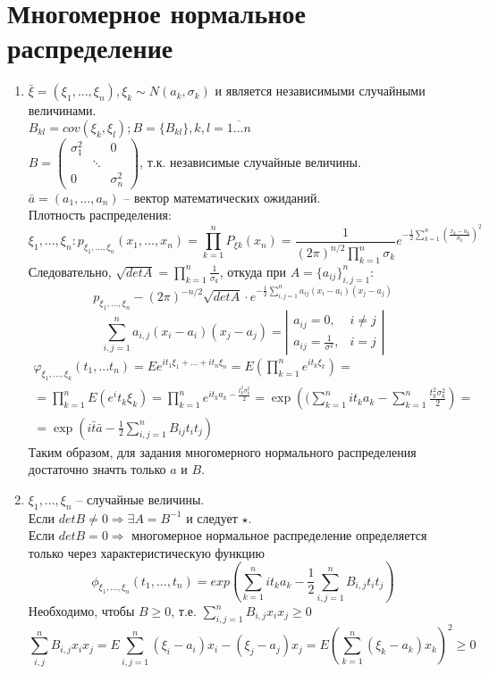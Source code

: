 \section{Многомерное нормальное распределение}
\begin{enumerate}
 \item $\bar{\xi}=(\xi_1,...,\xi_n), \xi_k \sim N(a_k, \sigma_k)$ и является независимыми случайными величинами.\\
 $B_{kl}=cov(\xi_k, \xi_l); B = \{B_{kl}\}, k,l = \overline{1...n}$\\
 $B = \begin{pmatrix}\sigma_{1}^2 &  & 0 \\ & \ddots & \\ 0 &  & \sigma_n^2\end{pmatrix}$, т.к. независимые случайные величины.\\
$\bar{a}=(a_1,...,a_n)$ -- вектор математических ожиданий.\\
Плотность распределения:
$$\xi_1, ..., \xi_n : p_{\xi_1,...,\xi_n}(x_1,...,x_n)=\prod\limits_{k=1}^{n}P_{\xi k}(x_n)=\frac{1}{(2\pi)^{n/2}\prod\limits_{k=1}^n \sigma_k}e^{-\frac{1}{2}\sum\limits_{k=1}^n\left(\frac{x_k-a_k}{\sigma_k}\right)^2}$$
Следовательно, $\sqrt{det A} = \prod\limits_{k=1}^{n} \frac{1}{\sigma_k}$, откуда при $A=\{ a_{ij}\}_{i,j=1}^n$:
\begin{equation}
\tag{$\star$}
p_{\xi_1,...,\xi_n}-(2\pi)^{-n/2}\sqrt{det A} \cdot e^{-\frac{1}{2}\sum\limits_{i,j=1}^n a_{ij}(x_i - a_i)(x_j - a_j)}
\end{equation}
$$\sum\limits_{i,j=1}^n a_{i,j}(x_i - a_i)(x_j - a_j)=\left|\begin{matrix}a_{ij}=0, & i\ne j\\a_{ij}=\frac{1}{\sigma^2}, & i = j\end{matrix}\right|$$
\begin{multline*}
\varphi_{\xi_1,...,\xi_k}(t_1,...t_n)=Ee^{it_1\xi_1+...+it_n\xi_n}=E\left(\prod\limits_{k=1}^n e^{it_k\xi_k}\right)=\\=\prod\limits_{k=1}^n E(e^it_k\xi_k)=\prod\limits_{k=1}^n e^{it_ka_k-\frac{t_k^2 \sigma_k^2}{2}} = \exp\left((\sum\limits_{k=1}^n i t_k a_k - \sum\limits_{k=1}^n \frac{t_k^2 \sigma_k^2}{2}\right)=\\=\exp\left(i\bar{t}\bar{a}-\frac{1}{2}\sum\limits_{i,j=1}^n B_{ij} t_i t_j\right)
\end{multline*}
Таким образом, для задания многомерного нормального распределения достаточно значть только $a$ и $B$.
\item $\xi_1,...,\xi_n$ -- случайные величины. \\
Если $det B \ne 0\Rightarrow\exists A = B^{-1}$ и следует $\star$.\\
Если $det B =0\Rightarrow $ многомерное нормальное распределение определяется только через характеристическую функцию
$$\phi_{\xi_1,...,\xi_n}(t_1,...,t_n)=exp\left(\sum\limits_{k=1}^n i t_k a_k -\frac{1}{2}\sum\limits_{i,j=1}^n B_{i,j}t_i t_j\right)$$
Необходимо, чтобы $B\geq 0$, т.е. $\sum\limits_{i,j=1}^n B_{i,j}x_i x_j \geq 0$
$$\sum\limits_{i,j}^n B_{i,j}x_i x_j = E\sum_{i,j=1}^n(\xi_i-a_i)x_i-(\xi_j-a_j)x_j=E\left(\sum\limits_{k=1}^n(\xi_k-a_k)x_k\right)^2 \geq 0$$
\end{enumerate}
